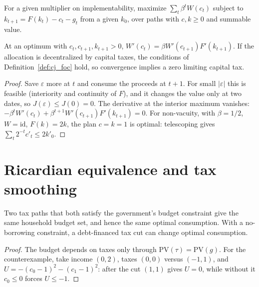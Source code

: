 \begin{definition}
\label{def:ramsey_primal}
\leanok
For a given multiplier on implementability, maximize $\sum_t\beta^tW(c_t)$ subject to $k_{t+1} = F(k_t) - c_t - g_t$ from a
given $k_0$, over paths with $c, k \ge 0$ and summable value.
\end{definition}

\begin{theorem}
\label{thm:ramsey_primal}
\leanok
{}
At an optimum with $c_t, c_{t+1}, k_{t+1} > 0$, $W'(c_t) = \beta W'(c_{t+1})F'(k_{t+1})$. If the allocation is decentralized by capital taxes, the
conditions of Definition~\ref{def:cj_foc} hold, so convergence implies a zero limiting capital tax.
\end{theorem}
\begin{proof}
\leanok
Save $\varepsilon$ more at $t$ and consume the proceeds at $t+1$. For small $|\varepsilon|$ this is feasible
(interiority and continuity of $F$), and it changes the value only at two
dates, so $J(\varepsilon) \le J(0) = 0$. The derivative at the interior maximum vanishes:
$-\beta^tW'(c_t) + \beta^{t+1}W'(c_{t+1})F'(k_{t+1}) = 0$. For non-vacuity, with $\beta = 1/2$, $W = \mathrm{id}$,
$F(k) = 2k$, the plan $c = k = 1$ is optimal: telescoping gives $\sum_t2^{-t}c'_t \le 2k'_0$.
\end{proof}

\section{Ricardian equivalence and tax smoothing}

\begin{theorem}
\label{thm:ricardian}
\leanok
Two tax paths that both satisfy the government's budget constraint give the same household budget set, and hence
the same optimal consumption. With a no-borrowing constraint, a debt-financed tax cut can change optimal
consumption.
\end{theorem}
\begin{proof}
\leanok
The budget depends on taxes only through $\mathrm{PV}(\tau) = \mathrm{PV}(g)$. For the counterexample, take income
$(0,2)$, taxes $(0,0)$ versus $(-1,1)$, and $U = -(c_0-1)^2 - (c_1-1)^2$: after the cut $(1,1)$ gives $U = 0$,
while without it $c_0 \le 0$ forces $U \le -1$.
\end{proof}

